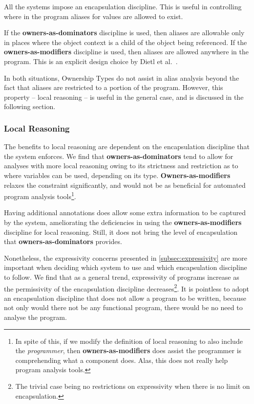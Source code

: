 \documentclass{acm_proc_article-sp}
\begin{document}
All the systems impose an encapsulation discipline. This is useful in
controlling where in the program aliases for values are allowed to exist.

If the \textbf{owners-as-dominators} discipline is used, then aliases are
allowable only in places where the object context is a child of the object
being referenced. If the \textbf{owners-as-modifiers} discipline is used, then
aliases are allowed anywhere in the program. This is an explicit design choice
by Dietl et al.~\cite{dietl07gut}.

In both situations, Ownership Types do not assist in alias analysis beyond
the fact that aliases are restricted to a portion of the program. However, this
property -- local reasoning -- is useful in the general case, and is discussed
in the following section.

\subsubsection{Local Reasoning}
\label{subsubsec:benefits_local_reasoning}

The benefits to local reasoning are dependent on the encapsulation discipline
that the system enforces. We find that \textbf{owners-as-dominators} tend to
allow for analyses with more local reasoning owing to its strictness and
restriction as to where variables can be used, depending on its type.
\textbf{Owners-as-modifiers} relaxes the constraint significantly, and would
not be as beneficial for automated program analysis tools\footnote{In spite of
this, if we modify the definition of local reasoning to also include the
\emph{programmer}, then \textbf{owners-as-modifiers} does assist the programmer
is comprehending what a component does. Alas, this does not really help program
analysis tools.}.

Having additional annotations does allow some extra information to be captured
by the system, ameliorating the deficiencies in using the
\textbf{owners-as-modifiers} discipline for local reasoning. Still, it does not
bring the level of encapsulation that \textbf{owners-as-dominators} provides.

Nonetheless, the expressivity concerns presented in \cref{subsec:expressivity}
are more important when deciding which system to use and which encapsulation
discipline to follow. We find that as a general trend, expressivity of programs
increase as the permissivity of the encapsulation discipline
decreases\footnote{The trivial case being no restrictions on expressivity when
there is no limit on encapsulation.}. It is pointless to adopt an encapsulation
discipline that does not allow a program to be written, because not only would
there not be any functional program, there would be no need to analyse the
program.
\end{document}
